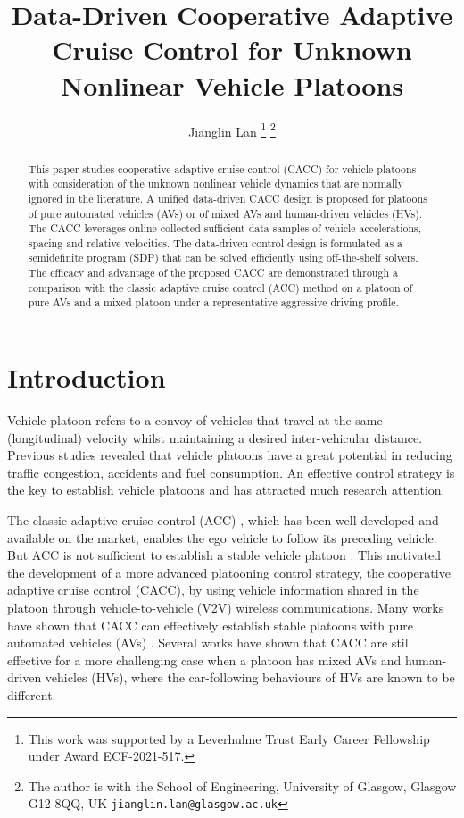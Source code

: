 \documentclass[letterpaper, 10 pt, conference]{ieeeconf}
\title{\LARGE \bf
	Data-Driven Cooperative Adaptive Cruise Control for Unknown Nonlinear Vehicle Platoons
}
\author{Jianglin Lan
	\thanks{This work was supported by a Leverhulme Trust Early Career 
		Fellowship under Award ECF-2021-517.}
	\thanks{The author is with the School of Engineering, University 
		of Glasgow, Glasgow G12 8QQ, UK {\tt\small jianglin.lan@glasgow.ac.uk}}
}
\begin{document}
	\maketitle
	
\begin{abstract}
This paper studies cooperative adaptive cruise control (CACC) for vehicle platoons with consideration of the unknown nonlinear vehicle dynamics that are normally ignored in the literature. A unified data-driven CACC design is proposed for platoons of pure automated vehicles (AVs) or of mixed AVs and human-driven vehicles (HVs). The CACC leverages online-collected sufficient data samples of vehicle accelerations, spacing and relative velocities. The data-driven control design is formulated as a semidefinite program (SDP) that can be solved efficiently using off-the-shelf solvers. The efficacy and advantage of the proposed CACC are demonstrated through a comparison with the classic adaptive cruise control (ACC) method on a platoon of pure AVs and a mixed platoon under a representative aggressive driving profile. 
\end{abstract}
	
	
\section{Introduction}
	Vehicle platoon refers to a convoy of vehicles that travel at the same (longitudinal) velocity  
	whilst maintaining a desired inter-vehicular distance. Previous studies  \cite{Arem+06,Ploeg+11,Yang+22} revealed 
	that vehicle platoons have a great potential in reducing traffic congestion, 
	accidents and fuel consumption. 
	An effective control strategy is the key to establish vehicle 
	platoons and has attracted much research attention. 
	
	The classic adaptive cruise control (ACC) \cite{XiaoGao10}, which has been 
	well-developed and available on the market, enables the ego vehicle to follow 
	its preceding vehicle. But ACC is not sufficient to establish a stable vehicle 
	platoon \cite{Shladover+12,Gunter+21}. This motivated the development 
	of a more advanced platooning control strategy, the cooperative adaptive cruise control 
	(CACC), by using 
	vehicle information shared in the platoon through vehicle-to-vehicle (V2V) wireless 
	communications. Many works have shown that CACC can effectively establish stable platoons 
	with pure automated vehicles (AVs) \cite{guanetti2018control,lan2020min}.
	Several works \cite{chen2020mixed,feng2019robust,hajdu2019robust,Lan+21d} have shown that CACC are still effective for a more challenging case when a platoon has mixed AVs and human-driven vehicles (HVs), where the car-following behaviours of HVs are known to be different. 
	
\end{document}
